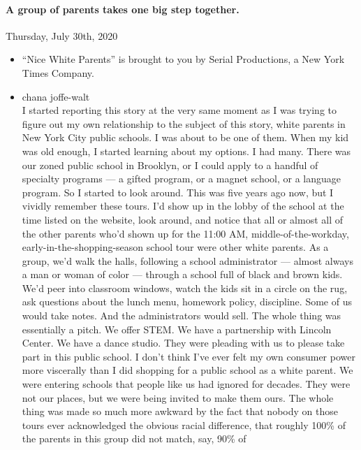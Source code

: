 \hypertarget{a-group-of-parents-takes-one-big-step-together}{%
\paragraph{A group of parents takes one big step
together.}\label{a-group-of-parents-takes-one-big-step-together}}

Thursday, July 30th, 2020

\begin{itemize}
\item
  ``Nice White Parents'' is brought to you by Serial Productions, a New
  York Times Company.
\item
  chana joffe-walt\\
  I started reporting this story at the very same moment as I was trying
  to figure out my own relationship to the subject of this story, white
  parents in New York City public schools. I was about to be one of
  them. When my kid was old enough, I started learning about my options.
  I had many. There was our zoned public school in Brooklyn, or I could
  apply to a handful of specialty programs --- a gifted program, or a
  magnet school, or a language program. So I started to look around.
  This was five years ago now, but I vividly remember these tours. I'd
  show up in the lobby of the school at the time listed on the website,
  look around, and notice that all or almost all of the other parents
  who'd shown up for the 11:00 AM, middle-of-the-workday,
  early-in-the-shopping-season school tour were other white parents. As
  a group, we'd walk the halls, following a school administrator ---
  almost always a man or woman of color --- through a school full of
  black and brown kids. We'd peer into classroom windows, watch the kids
  sit in a circle on the rug, ask questions about the lunch menu,
  homework policy, discipline. Some of us would take notes. And the
  administrators would sell. The whole thing was essentially a pitch. We
  offer STEM. We have a partnership with Lincoln Center. We have a dance
  studio. They were pleading with us to please take part in this public
  school. I don't think I've ever felt my own consumer power more
  viscerally than I did shopping for a public school as a white parent.
  We were entering schools that people like us had ignored for decades.
  They were not our places, but we were being invited to make them ours.
  The whole thing was made so much more awkward by the fact that nobody
  on those tours ever acknowledged the obvious racial difference, that
  roughly 100\% of the parents in this group did not match, say, 90\% of

\end{itemize}
